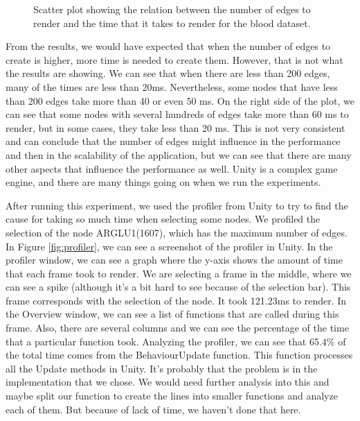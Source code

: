 \begin{figure}[h!]
  \centering
  \begin{minipage}{.8\textwidth}
  \end{minipage}
\caption{Scatter plot showing the relation between the number of edges to render and the time that it takes to render for the blood dataset.}
\label{fig:scalability_edges_blood}
\end{figure}

From the results, we would have expected that when the number of edges to create is higher, more time is needed to create them. However, that is not what the results are showing. We can see that when there are less than 200 edges, many of the times are less than 20ms. Nevertheless, some nodes that have less than 200 edges take more than 40 or even 50 ms. On the right side of the plot, we can see that some nodes with several hundreds of edges take more than 60 ms to render, but in some cases, they take less than 20 ms. This is not very consistent and can conclude that the number of edges might influence in the performance and then in the scalability of the application, but we can see that there are many other aspects that influence the performance as well. Unity is a complex game engine, and there are many things going on when we run the experiments.

After running this experiment, we used the profiler from Unity to try to find the cause for taking so much time when selecting some nodes. We profiled the selection of the node ARGLU1(1607), which has the maximum number of edges. In Figure \ref{fig:profiler}, we can see a screenshot of the profiler in Unity. In the profiler window, we can see a graph where the y-axis shows the amount of time that each frame took to render. We are selecting a frame in the middle, where we can see a spike (although it's a bit hard to see because of the selection bar). This frame corresponds with the selection of the node. It took 121.23ms to render. In the Overview window, we can see a list of functions that are called during this frame. Also, there are several columns and we can see the percentage of the time that a particular function took. Analyzing the profiler, we can see that 65.4\% of the total time comes from the BehaviourUpdate function. This function processes all the Update methods in Unity. It's probably that the problem is in the implementation that we chose. We would need further analysis into this and maybe split our function to create the lines into smaller functions and analyze each of them. But because of lack of time, we haven't done that here.

